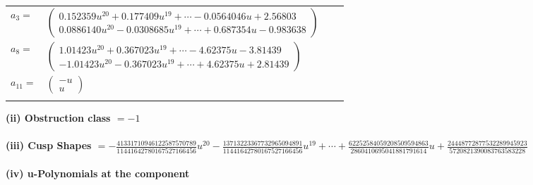 \documentclass[1p]{elsarticle_modified}
\theoremstyle{definition}
\begin{document}
\begin{tabular}{m{7pt} m{180pt} m{7pt} m{180pt} }
\flushright $a_{3}=$&$\begin{pmatrix}0.152359 u^{20}+0.177409 u^{19}+\cdots-0.0564046 u+2.56803\\0.0886140 u^{20}-0.0308685 u^{19}+\cdots+0.687354 u-0.983638\end{pmatrix}$ \\
\flushright $a_{8}=$&$\begin{pmatrix}1.01423 u^{20}+0.367023 u^{19}+\cdots-4.62375 u-3.81439\\-1.01423 u^{20}-0.367023 u^{19}+\cdots+4.62375 u+2.81439\end{pmatrix}$ \\
\flushright $a_{11}=$&$\begin{pmatrix}- u\\u\end{pmatrix}$\\&\end{tabular}
\flushleft \textbf{(ii) Obstruction class $= -1$}\\~\\
\flushleft \textbf{(iii) Cusp Shapes $= -\frac{41331710946122587570789}{11441642780167527166456} u^{20}-\frac{13713223367732965094891}{11441642780167527166456} u^{19}+\cdots+\frac{62252584059208509594863}{2860410695041881791614} u+\frac{24448772877532289945923}{5720821390083763583228}$}\\~\\
\newpage\renewcommand{\arraystretch}{1}
\flushleft \textbf{(iv) u-Polynomials at the component}\newline \\
\end{document}
